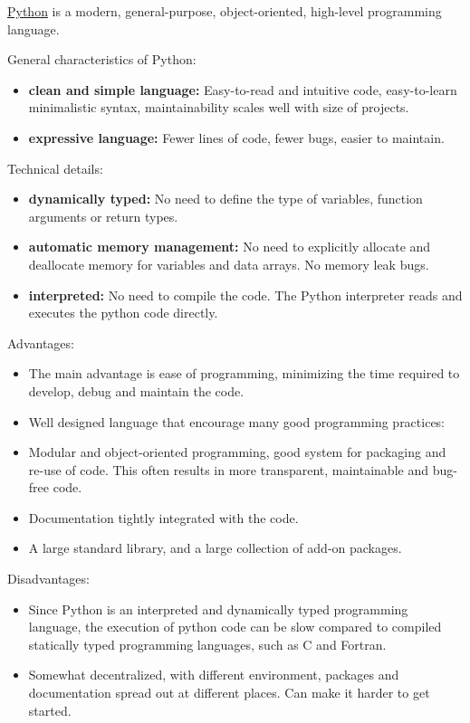 \documentclass[11pt]{article}
\providecommand{\tightlist}{%
      \setlength{\itemsep}{0pt}\setlength{\parskip}{0pt}}
\begin{document}
    \href{http://www.python.org/}{Python} is a modern, general-purpose,
object-oriented, high-level programming language.

General characteristics of Python:

\begin{itemize}
\tightlist
\item
  \textbf{clean and simple language:} Easy-to-read and intuitive code,
  easy-to-learn minimalistic syntax, maintainability scales well with
  size of projects.
\item
  \textbf{expressive language:} Fewer lines of code, fewer bugs, easier
  to maintain.
\end{itemize}

Technical details:

\begin{itemize}
\tightlist
\item
  \textbf{dynamically typed:} No need to define the type of variables,
  function arguments or return types.
\item
  \textbf{automatic memory management:} No need to explicitly allocate
  and deallocate memory for variables and data arrays. No memory leak
  bugs.
\item
  \textbf{interpreted:} No need to compile the code. The Python
  interpreter reads and executes the python code directly.
\end{itemize}

Advantages:

\begin{itemize}
\tightlist
\item
  The main advantage is ease of programming, minimizing the time
  required to develop, debug and maintain the code.
\item
  Well designed language that encourage many good programming practices:
\item
  Modular and object-oriented programming, good system for packaging and
  re-use of code. This often results in more transparent, maintainable
  and bug-free code.
\item
  Documentation tightly integrated with the code.
\item
  A large standard library, and a large collection of add-on packages.
\end{itemize}

Disadvantages:

\begin{itemize}
\tightlist
\item
  Since Python is an interpreted and dynamically typed programming
  language, the execution of python code can be slow compared to
  compiled statically typed programming languages, such as C and
  Fortran.
\item
  Somewhat decentralized, with different environment, packages and
  documentation spread out at different places. Can make it harder to
  get started.
\end{itemize}
\end{document}
